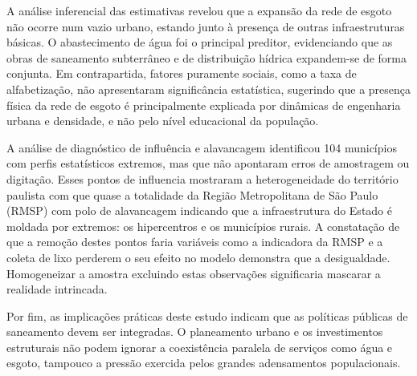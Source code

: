 \documentclass[12pt, a4paper]{article}
\begin{document}
A análise inferencial das estimativas revelou que a expansão da rede de esgoto não ocorre num vazio urbano, estando junto à presença de outras infraestruturas básicas. O abastecimento de água foi o principal preditor, evidenciando que as obras de saneamento subterrâneo e de distribuição hídrica expandem-se de forma conjunta. Em contrapartida, fatores puramente sociais, como a taxa de alfabetização, não apresentaram significância estatística, sugerindo que a presença física da rede de esgoto é principalmente explicada por dinâmicas de engenharia urbana e densidade, e não pelo nível educacional da população.

A análise de diagnóstico de influência e alavancagem identificou 104 municípios com perfis estatísticos extremos, mas que não apontaram erros de amostragem ou digitação. Esses pontos de influencia mostraram a heterogeneidade do território paulista com que quase a totalidade da Região Metropolitana de São Paulo (RMSP) com polo de alavancagem indicando que a infraestrutura do Estado é moldada por extremos: os hipercentros e os municípios rurais. A constatação de que a remoção destes pontos faria variáveis como a indicadora da RMSP e a coleta de lixo perderem o seu efeito no modelo demonstra que a desigualdade. Homogeneizar a amostra excluindo estas observações significaria mascarar a realidade intrincada.

Por fim, as implicações práticas deste estudo indicam que as políticas públicas de saneamento devem ser integradas. O planeamento urbano e os investimentos estruturais não podem ignorar a coexistência paralela de serviços como água e esgoto, tampouco a pressão exercida pelos grandes adensamentos populacionais.

\newpage

\end{document}
